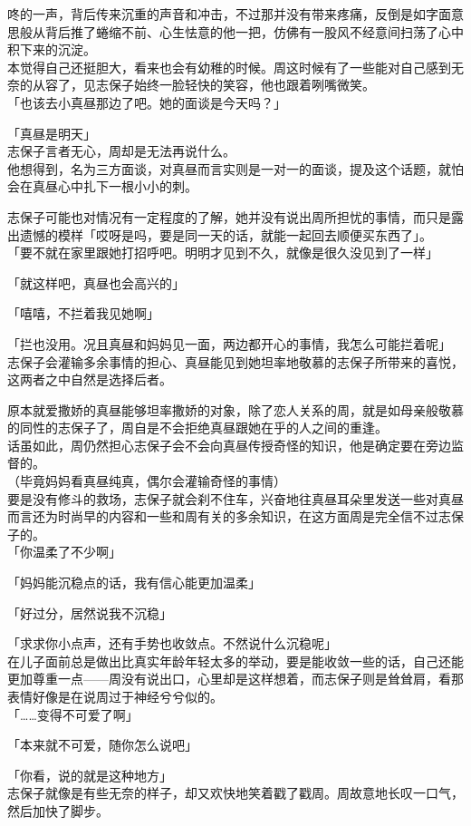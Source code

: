 咚的一声，背后传来沉重的声音和冲击，不过那并没有带来疼痛，反倒是如字面意思般从背后推了蜷缩不前、心生怯意的他一把，仿佛有一股风不经意间扫荡了心中积下来的沉淀。\\

本觉得自己还挺胆大，看来也会有幼稚的时候。周这时候有了一些能对自己感到无奈的从容了，见志保子始终一脸轻快的笑容，他也跟着咧嘴微笑。\\

「也该去小真昼那边了吧。她的面谈是今天吗？」

「真昼是明天」\\

志保子言者无心，周却是无法再说什么。\\

他想得到，名为三方面谈，对真昼而言实则是一对一的面谈，提及这个话题，就怕会在真昼心中扎下一根小小的刺。

志保子可能也对情况有一定程度的了解，她并没有说出周所担忧的事情，而只是露出遗憾的模样「哎呀是吗，要是同一天的话，就能一起回去顺便买东西了」。\\

「要不就在家里跟她打招呼吧。明明才见到不久，就像是很久没见到了一样」

「就这样吧，真昼也会高兴的」

「嘻嘻，不拦着我见她啊」

「拦也没用。况且真昼和妈妈见一面，两边都开心的事情，我怎么可能拦着呢」\\

志保子会灌输多余事情的担心、真昼能见到她坦率地敬慕的志保子所带来的喜悦，这两者之中自然是选择后者。

原本就爱撒娇的真昼能够坦率撒娇的对象，除了恋人关系的周，就是如母亲般敬慕的同性的志保子了，周自是不会拒绝真昼跟她在乎的人之间的重逢。\\

话虽如此，周仍然担心志保子会不会向真昼传授奇怪的知识，他是确定要在旁边监督的。\\

（毕竟妈妈看真昼纯真，偶尔会灌输奇怪的事情）\\

要是没有修斗的救场，志保子就会刹不住车，兴奋地往真昼耳朵里发送一些对真昼而言还为时尚早的内容和一些和周有关的多余知识，在这方面周是完全信不过志保子的。\\

「你温柔了不少啊」

「妈妈能沉稳点的话，我有信心能更加温柔」

「好过分，居然说我不沉稳」

「求求你小点声，还有手势也收敛点。不然说什么沉稳呢」\\

在儿子面前总是做出比真实年龄年轻太多的举动，要是能收敛一些的话，自己还能更加尊重一点——周没有说出口，心里却是这样想着，而志保子则是耸耸肩，看那表情好像是在说周过于神经兮兮似的。\\

「……变得不可爱了啊」

「本来就不可爱，随你怎么说吧」

「你看，说的就是这种地方」\\

志保子就像是有些无奈的样子，却又欢快地笑着戳了戳周。周故意地长叹一口气，然后加快了脚步。

